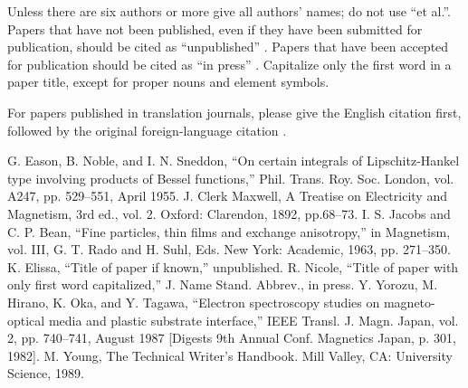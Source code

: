 \documentclass[conference]{IEEEtran}
\begin{document}
Unless there are six authors or more give all authors' names; do not use 
``et al.''. Papers that have not been published, even if they have been 
submitted for publication, should be cited as ``unpublished'' \cite{b4}. Papers 
that have been accepted for publication should be cited as ``in press'' \cite{b5}. 
Capitalize only the first word in a paper title, except for proper nouns and 
element symbols.

For papers published in translation journals, please give the English 
citation first, followed by the original foreign-language citation \cite{b6}.

\begin{thebibliography}{00}
 G. Eason, B. Noble, and I. N. Sneddon, ``On certain integrals of Lipschitz-Hankel type involving products of Bessel functions,'' Phil. Trans. Roy. Soc. London, vol. A247, pp. 529--551, April 1955.
 J. Clerk Maxwell, A Treatise on Electricity and Magnetism, 3rd ed., vol. 2. Oxford: Clarendon, 1892, pp.68--73.
 I. S. Jacobs and C. P. Bean, ``Fine particles, thin films and exchange anisotropy,'' in Magnetism, vol. III, G. T. Rado and H. Suhl, Eds. New York: Academic, 1963, pp. 271--350.
 K. Elissa, ``Title of paper if known,'' unpublished.
 R. Nicole, ``Title of paper with only first word capitalized,'' J. Name Stand. Abbrev., in press.
 Y. Yorozu, M. Hirano, K. Oka, and Y. Tagawa, ``Electron spectroscopy studies on magneto-optical media and plastic substrate interface,'' IEEE Transl. J. Magn. Japan, vol. 2, pp. 740--741, August 1987 [Digests 9th Annual Conf. Magnetics Japan, p. 301, 1982].
 M. Young, The Technical Writer's Handbook. Mill Valley, CA: University Science, 1989.
\end{thebibliography}
\vspace{12pt}
\end{document}
